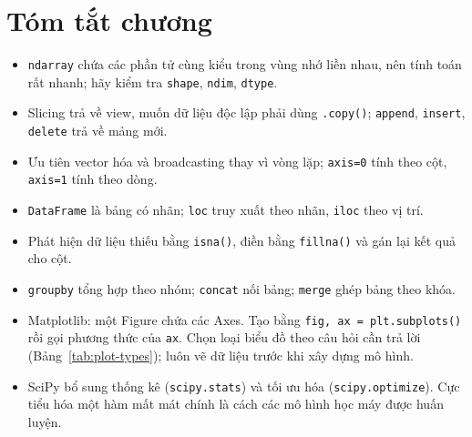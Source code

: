 \section{Tóm tắt chương}
\begin{itemize}
    \item \texttt{ndarray} chứa các phần tử cùng kiểu trong vùng nhớ liền nhau, nên tính toán rất nhanh; hãy kiểm tra \texttt{shape}, \texttt{ndim}, \texttt{dtype}.
    \item Slicing trả về view, muốn dữ liệu độc lập phải dùng \texttt{.copy()}; \texttt{append}, \texttt{insert}, \texttt{delete} trả về mảng mới.
    \item Ưu tiên vector hóa và broadcasting thay vì vòng lặp; \texttt{axis=0} tính theo cột, \texttt{axis=1} tính theo dòng.
    \item \texttt{DataFrame} là bảng có nhãn; \texttt{loc} truy xuất theo nhãn, \texttt{iloc} theo vị trí.
    \item Phát hiện dữ liệu thiếu bằng \texttt{isna()}, điền bằng \texttt{fillna()} và gán lại kết quả cho cột.
    \item \texttt{groupby} tổng hợp theo nhóm; \texttt{concat} nối bảng; \texttt{merge} ghép bảng theo khóa.
    \item Matplotlib: một Figure chứa các Axes. Tạo bằng \texttt{fig, ax = plt.subplots()} rồi gọi phương thức của \texttt{ax}. Chọn loại biểu đồ theo câu hỏi cần trả lời (Bảng~\ref{tab:plot-types}); luôn vẽ dữ liệu trước khi xây dựng mô hình.
    \item SciPy bổ sung thống kê (\texttt{scipy.stats}) và tối ưu hóa (\texttt{scipy.optimize}). Cực tiểu hóa một hàm mất mát chính là cách các mô hình học máy được huấn luyện.
\end{itemize}

